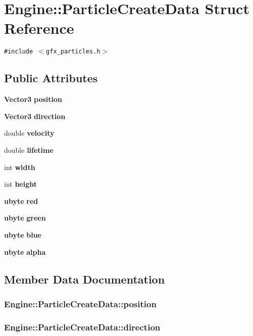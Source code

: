 \section{Engine::ParticleCreateData Struct Reference}
\label{structEngine_1_1ParticleCreateData}
{\tt \#include $<$gfx\_\-particles.h$>$}

\subsection*{Public Attributes}
\begin{CompactItemize}
\item 
{\bf Vector3} {\bf position}
\item 
{\bf Vector3} {\bf direction}
\item 
double {\bf velocity}
\item 
double {\bf lifetime}
\item 
int {\bf width}
\item 
int {\bf height}
\item 
{\bf ubyte} {\bf red}
\item 
{\bf ubyte} {\bf green}
\item 
{\bf ubyte} {\bf blue}
\item 
{\bf ubyte} {\bf alpha}
\end{CompactItemize}


\subsection{Member Data Documentation}
\subsubsection{ {\bf Engine::ParticleCreateData::position}}\label{structEngine_1_1ParticleCreateData_ad7a27a781b160feb7b83b76daa8c27a}


\subsubsection{ {\bf Engine::ParticleCreateData::direction}}\label{structEngine_1_1ParticleCreateData_9aa97ddb73ca579438d327d5b563d3e6}


